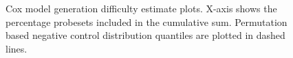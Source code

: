 \documentclass[letterpaper,12pt]{article}
\begin{document}
\begin{figure}[!th]

\centering
{}
\caption{Cox model generation difficulty estimate plots. X-axis shows the percentage probesets included in the cumulative sum. Permutation based negative control distribution quantiles are plotted in dashed lines.}
\label{Fig:DifficultyPlots}
\end{figure}
\end{document}
